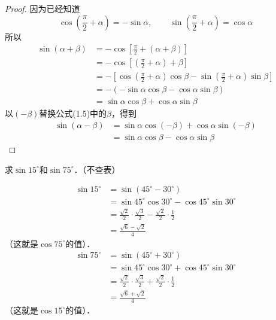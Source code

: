 \begin{proof}
因为已经知道
\[\cos\left(\frac{\pi}{2}+\alpha\right)=-\sin\alpha,\qquad \sin\left(\frac{\pi}{2}+\alpha\right)=\cos\alpha\]
所以
\[\begin{split}
 \sin(\alpha+\beta) &=-\cos\left[\frac{\pi}{2}+(\alpha+\beta)\right]\\
 &=-\cos\left[\left(\frac{\pi}{2}+\alpha\right)+\beta\right]\\
&=-\left[\cos\left(\frac{\pi}{2}+\alpha\right)\cos\beta-\sin\left(\frac{\pi}{2}+\alpha\right)\sin\beta\right]\\    
&=-\left(-\sin\alpha\cos\beta-\cos\alpha\sin\beta\right)\\
&=\sin\alpha\cos\beta+\cos\alpha\sin\beta
\end{split}\]
以$(-\beta)$替换公式(1.5)中的$\beta$，得到
\[\begin{split}
  \sin(\alpha-\beta)&=\sin\alpha\cos(-\beta)+\cos\alpha\sin(-\beta)\\
  &=\sin\alpha\cos\beta-\cos\alpha\sin\beta  
\end{split}\]
\end{proof}

\begin{example}
    求$\sin15^{\circ}$和$\sin75^{\circ}$．（不查表）
\end{example}

\begin{solution}
    \[\begin{split}
        \sin 15^{\circ}&=\sin (45^{\circ}-30^{\circ})\\
        &=\sin45^{\circ}\cos30^{\circ}-\cos45^{\circ}\sin30^{\circ}\\
        &=\frac{\sqrt{2}}{2}\cdot\frac{\sqrt{3}}{2}-\frac{\sqrt{2}}{2}\cdot\frac{1}{2}\\
        &=\frac{\sqrt{6}-\sqrt{2}}{4}
    \end{split}\]
    （这就是$\cos75^{\circ}$的值）．
    \[\begin{split}
        \sin 75^{\circ}&=\sin (45^{\circ}+30^{\circ})\\
        &=\sin45^{\circ}\cos30^{\circ}+\cos45^{\circ}\sin30^{\circ}\\
        &=\frac{\sqrt{2}}{2}\cdot\frac{\sqrt{3}}{2}+\frac{\sqrt{2}}{2}\cdot\frac{1}{2}\\
        &=\frac{\sqrt{6}+\sqrt{2}}{4}  
    \end{split}\]
    （这就是$\cos15^{\circ}$的值）．
\end{solution}

